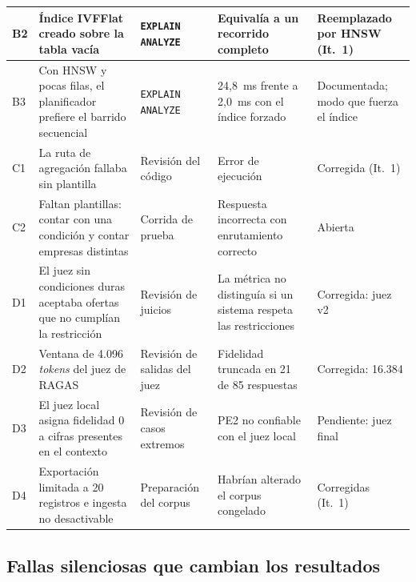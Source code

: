 {\begin{longtable}{|p{0.6cm}|p{4.4cm}|p{2.8cm}|p{3.6cm}|p{2.6cm}|}
    \hline
    B2 & Índice IVFFlat creado sobre la tabla vacía & \texttt{EXPLAIN ANALYZE} & Equivalía a un recorrido completo & Reemplazado por HNSW (It.~1) \\
    \hline
    B3 & Con HNSW y pocas filas, el planificador prefiere el barrido secuencial & \texttt{EXPLAIN ANALYZE} & 24,8~ms frente a 2,0~ms con el índice forzado & Documentada; modo que fuerza el índice \\
    \hline
    C1 & La ruta de agregación fallaba sin plantilla & Revisión del código & Error de ejecución & Corregida (It.~1) \\
    \hline
    C2 & Faltan plantillas: contar con una condición y contar empresas distintas & Corrida de prueba & Respuesta incorrecta con enrutamiento correcto & Abierta \\
    \hline
    D1 & El juez sin condiciones duras aceptaba ofertas que no cumplían la restricción & Revisión de juicios & La métrica no distinguía si un sistema respeta las restricciones & Corregida: juez v2 \\
    \hline
    D2 & Ventana de 4.096 \textit{tokens} del juez de RAGAS & Revisión de salidas del juez & Fidelidad truncada en 21 de 85 respuestas & Corregida: 16.384 \\
    \hline
    D3 & El juez local asigna fidelidad 0 a cifras presentes en el contexto & Revisión de casos extremos & PE2 no confiable con el juez local & Pendiente: juez final \\
    \hline
    D4 & Exportación limitada a 20 registros e ingesta no desactivable & Preparación del corpus & Habrían alterado el corpus congelado & Corregidas (It.~1) \\
    \hline
\end{longtable}
}

\subsection{Fallas silenciosas que cambian los resultados}

